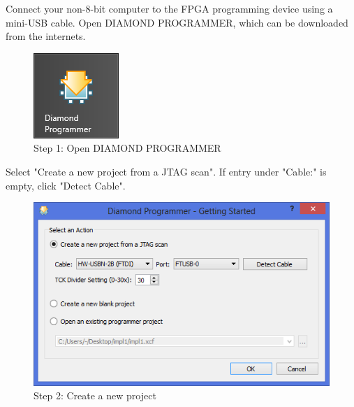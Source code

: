 Connect your non-8-bit computer to the FPGA programming device using a mini-USB cable. Open DIAMOND PROGRAMMER, which can be downloaded from the internets.

\begin{figure}
  \includegraphics[width=\linewidth]{images/diamond01.png}
  \caption{Step 1: Open DIAMOND PROGRAMMER}
  \label{fig:diamond01}
\end{figure}

Select "Create a new project from a JTAG scan". If entry under "Cable:" is empty, click "Detect Cable".

\begin{figure}
  \includegraphics[width=\linewidth]{images/diamond02.png}
  \caption{Step 2: Create a new project}
  \label{fig:diamond02}
\end{figure}


